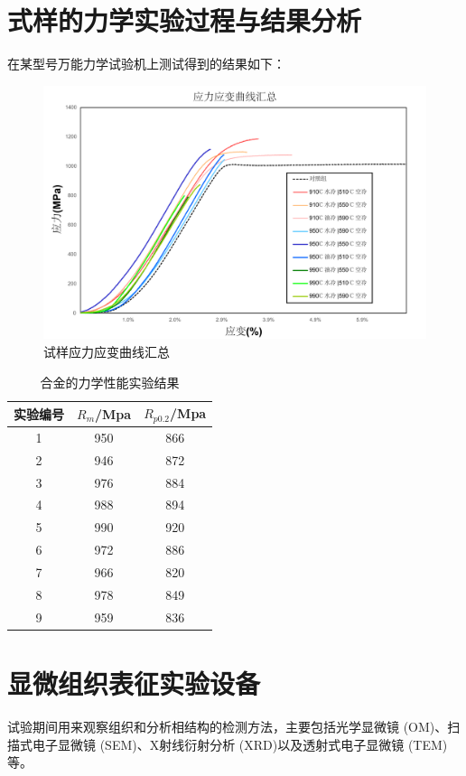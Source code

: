 \section{式样的力学实验过程与结果分析}
在某型号万能力学试验机上测试得到的结果如下：
\begin{figure}[h!]
	\centering
	\includegraphics[width=0.99\linewidth]{pic/试样应力应变曲线汇总.pdf}
	\caption{试样应力应变曲线汇总}
	\label{fig:试样应力应变曲线汇总}
\end{figure}

\begin{table}[htbp]
	\centering
	\caption{\ti 合金的力学性能实验结果}
	\label{sec:mystrength}
		\begin{tabular}{ccc}
			\toprule
			实验编号&$ R_m $/Mpa&$ R_{p0.2} $/Mpa \\
			\midrule
			1 & 950 & 866\\
			2 & 946 & 872\\
			3 & 976 & 884\\
			4 & 988 & 894\\
			5 & 990 & 920\\
			6 & 972 & 886\\
			7 & 966 & 820\\
			8 & 978 & 849\\
			9 & 959 & 836\\
			\bottomrule
		\end{tabular}
\end{table}
\newpage
\section{显微组织表征实验设备}
试验期间用来观察组织和分析相结构的检测方法，主要包括光学显微镜 (OM)、扫描式电子显微镜 (SEM)、X射线衍射分析 (XRD)以及透射式电子显微镜 (TEM)等。


